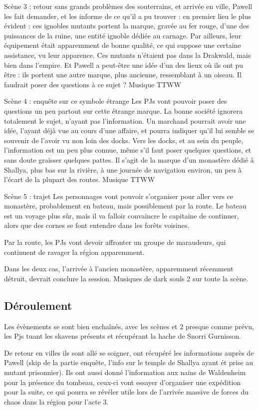 \documentclass[10pt,a4paper]{book}
\begin{document}
Scène 3 : retour sans grands problèmes des souterrains, et arrivée en ville, Pawell les fait demander, et les informe de ce qu'il a pu trouver : en premier lieu le plus évident : ces ignobles mutants portent la marque, gravée au fer rouge, d'une des puissances de la ruine, une entité ignoble dédiée au carnage. Par ailleurs, leur équipement était apparemment de bonne qualité, ce qui suppose une certaine assistance, vu leur apparence. Ces mutants n'étaient pas dans la Drakwald, mais bien dans l'empire. Et Pawell a peut-être une idée d'un des lieux où ils ont pu être : ils portent une autre marque, plus ancienne, ressemblant à un oiseau. Il faudrait poser des questions à ce sujet ? Musique TTWW

Scène 4 : enquête sur ce symbole étrange
Les PJs vont pouvoir poser des questions un peu partout sur cette étrange marque. La bonne société ignorera totalement le sujet, n'ayant pas l'information. Un marchand pourrait avoir une idée, l'ayant déjà vue au cours d'une affaire, et pourra indiquer qu'il lui semble se souvenir de l'avoir vu non loin des docks. Vers les docks, et au sein du peuple, l'information est un peu plus connue, même s'il faut poser quelques questions, et sans doute graisser quelques pattes. Il s'agit de la marque d'un monastère dédié à Shallya, plus bas sur la rivière, à une journée de navigation environ, un peu à l'écart de la plupart des routes. Musique TTWW

Scène 5 : trajet
Les personnages vont pouvoir s'organiser pour aller vers ce monastère, probablement en bateau, mais possiblement par la route.
Le bateau est un voyage plus sûr, mais il va falloir convaincre le capitaine de continuer, alors que des cornes se font entendre dans les forêts voisines.

Par la route, les PJs vont devoir affronter un groupe de maraudeurs, qui continuent de ravager la région apparemment.

Dans les deux cas, l'arrivée à l'ancien monastère, apparemment récemment détruit, devrait conclure la session. Musiques de dark souls 2 sur toute la scène.


\subsection{Déroulement}
Les évènements se sont bien enchaînés, avec les scènes  et 2 presque comme prévu, les Pjs tuant les skavens présents et récupérant la hache de Snorri Gurnisson.

De retour en villes ils sont allé se soigner, ont récupéré les informations auprès de Pawell (skip de la partie enquête, l'info sur le temple de Shallya ayant ét prise au mutant prisonnier). Ils ont aussi donné l'information aux nains de Waldenheim pour la présence du tombeau, ceux-ci vont essayer d'organiser une expédition pour la suite, ce qui pourra se révéler utile lors de l'arrivée massive de forces du chaos dans la région pour l'acte 3.
\end{document}
